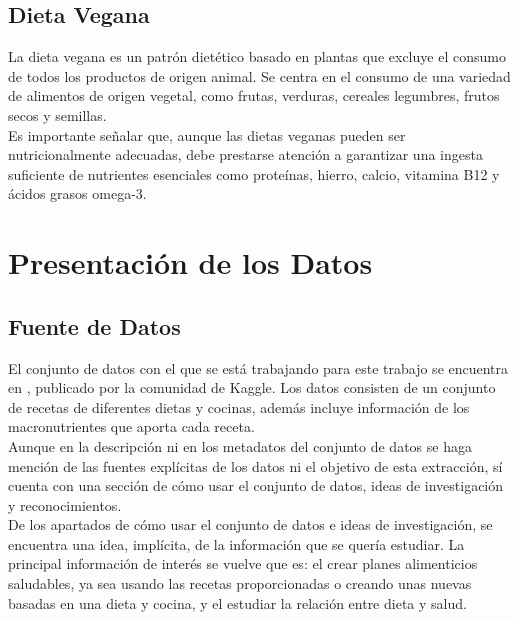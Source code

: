 \documentclass[12pt,a4paper]{article}
\begin{document}
    \subsection{Dieta Vegana}

        \cite{marvastipopular} La dieta vegana es un patrón dietético basado en 
        plantas que excluye el consumo de todos los productos de origen animal. Se 
        centra en el consumo de una variedad de alimentos de origen vegetal, como 
        frutas, verduras, cereales legumbres, frutos secos y semillas.\\

        Es importante señalar que, aunque las dietas veganas pueden ser 
        nutricionalmente adecuadas, debe prestarse atención a garantizar una 
        ingesta suficiente de nutrientes esenciales como proteínas, hierro, 
        calcio, vitamina B12 y ácidos grasos omega-3.

\newpage

\section{Presentación de los Datos}

    \subsection{Fuente de Datos}

        El conjunto de datos con el que se está trabajando para este trabajo 
        se encuentra en \cite{dataset_macronutrients}, publicado por la comunidad 
        de Kaggle. Los datos consisten de un conjunto de recetas de diferentes 
        dietas y cocinas, además incluye información de los macronutrientes que 
        aporta cada receta.\\

        \cite{dataset_macronutrients} Aunque en la descripción ni en los metadatos del conjunto de datos se 
        haga mención de las fuentes explícitas de los datos ni el objetivo de 
        esta extracción, sí cuenta con una sección de cómo usar el conjunto de 
        datos, ideas de investigación y reconocimientos.\\

        De los apartados de cómo usar el conjunto de datos e ideas de investigación, 
        se encuentra una idea, implícita, de la información que se quería estudiar. 
        La principal información de interés se vuelve que es: el crear planes 
        alimenticios saludables, ya sea usando las recetas proporcionadas o creando 
        unas nuevas basadas en una dieta y cocina, y el estudiar la relación entre 
        dieta y salud.\\
\end{document}
